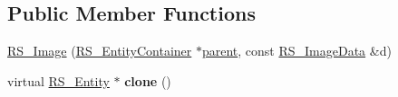 \subsection*{Public Member Functions}
\begin{DoxyCompactItemize}
\item 
\hyperlink{classRS__Image_ac0b11c53b39a5bd778b623ed5d5ecc52}{R\-S\-\_\-\-Image} (\hyperlink{classRS__EntityContainer}{R\-S\-\_\-\-Entity\-Container} $\ast$\hyperlink{classRS__Entity_a80358a8d2fc6739a516a278dc500b49f}{parent}, const \hyperlink{classRS__ImageData}{R\-S\-\_\-\-Image\-Data} \&d)
\item 
\hypertarget{classRS__Image_a5e1d9f938e423ec6ab3414489fc09d77}{virtual \hyperlink{classRS__Entity}{R\-S\-\_\-\-Entity} $\ast$ {\bfseries clone} ()}\label{classRS__Image_a5e1d9f938e423ec6ab3414489fc09d77}


\end{DoxyCompactItemize}
